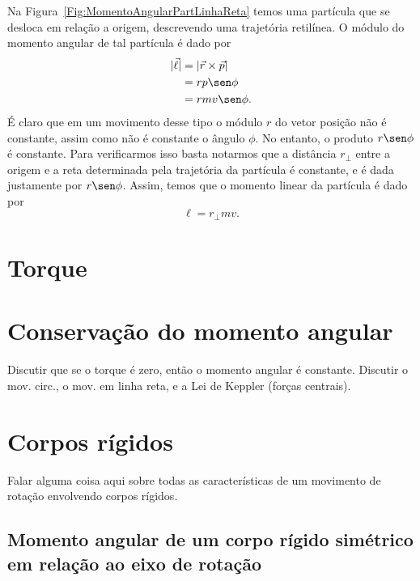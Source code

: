 Na Figura~\ref{Fig:MomentoAngularPartLinhaReta} temos uma partícula que se desloca em relação a origem, descrevendo uma trajetória retilínea. O módulo do momento angular de tal partícula é dado por
\begin{align}
    |\vec{\ell}| &= |\vec{r}\times\vec{p}| \\
    &= r p \sen\phi \\
    &= r m v \sen\phi.
\end{align}
%
É claro que em um movimento desse tipo o módulo $r$ do vetor posição não é constante, assim como não é constante o ângulo $\phi$. No entanto, o produto $r\sen\phi$ é constante. Para verificarmos isso basta notarmos que a distância $r_\perp$ entre a origem e a reta determinada pela trajetória da partícula é constante, e é dada justamente por $r\sen\phi$. Assim, temos que o momento linear da partícula é dado por
\begin{equation}
    \ell = r_\perp m v.
\end{equation}

\section{Torque}

\section{Conservação do momento angular}

Discutir que se o torque é zero, então o momento angular é constante. Discutir o mov. circ., o mov. em linha reta, e a Lei de Keppler (forças centrais).


\section{Corpos rígidos}

Falar alguma coisa aqui sobre todas as características de um movimento de rotação envolvendo corpos rígidos.


\subsection{Momento angular de um corpo rígido simétrico em relação ao eixo de rotação}

